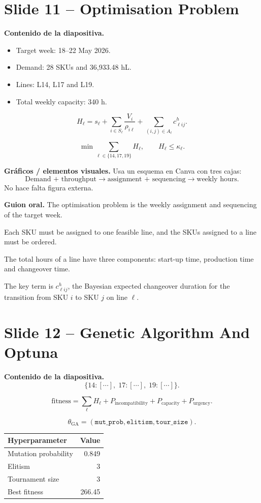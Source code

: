 \documentclass[11pt,a4paper]{article}
\newcommand{\slide}[1]{\newpage\section*{#1}}
\newcommand{\say}{\textbf{Guion oral.} }
\newcommand{\content}{\textbf{Contenido de la diapositiva.} }
\newcommand{\figs}{\textbf{Gráficos / elementos visuales.} }
\begin{document}
\slide{Slide 11 -- Optimisation Problem}

\content
\begin{itemize}
    \item Target week: 18--22 May 2026.
    \item Demand: 28 SKUs and 36,933.48 hL.
    \item Lines: L14, L17 and L19.
    \item Total weekly capacity: 340 h.
\end{itemize}

\[
H_{\ell}
=
s_{\ell}
+
\sum_{i\in S_{\ell}}
\frac{V_i}{\rho_{i\ell}}
+
\sum_{(i,j)\in A_{\ell}}
c^h_{\ell ij}.
\]

\[
\min
\sum_{\ell\in\{14,17,19\}}
H_{\ell},
\qquad
H_\ell \leq \kappa_\ell.
\]

\figs
Usa un esquema en Canva con tres cajas:
\[
\text{Demand + throughput}
\rightarrow
\text{assignment + sequencing}
\rightarrow
\text{weekly hours}.
\]
No hace falta figura externa.

\say
The optimisation problem is the weekly assignment and sequencing of the target
week.

Each SKU must be assigned to one feasible line, and the SKUs assigned to a line
must be ordered.

The total hours of a line have three components: start-up time, production time
and changeover time.

The key term is \(c^h_{\ell ij}\), the Bayesian expected changeover duration for
the transition from SKU \(i\) to SKU \(j\) on line \(\ell\).

\slide{Slide 12 -- Genetic Algorithm And Optuna}

\content
\[
\{14:[\cdots],\;17:[\cdots],\;19:[\cdots]\}.
\]

\[
\text{fitness}
=
\sum_\ell H_\ell
+
P_{\text{incompatibility}}
+
P_{\text{capacity}}
+
P_{\text{urgency}}.
\]

\[
\theta_{\text{GA}}
=
(
\texttt{mut\_prob},
\texttt{elitism},
\texttt{tour\_size}
).
\]

\begin{table}[H]\centering
\begin{tabular}{@{}lr@{}}
\toprule
Hyperparameter & Value \\
\midrule
Mutation probability & 0.849 \\
Elitism & 3 \\
Tournament size & 3 \\
Best fitness & 266.45 \\
\bottomrule
\end{tabular}
\end{table}
\end{document}
